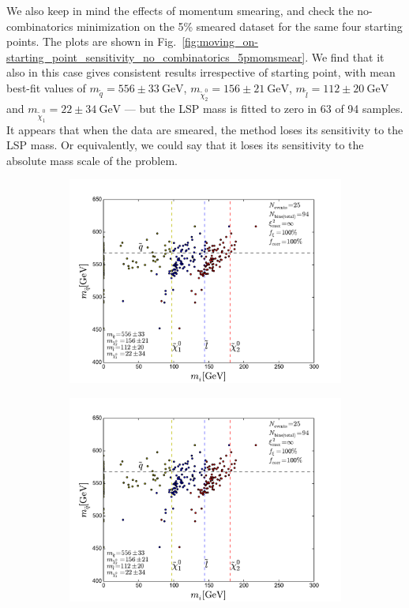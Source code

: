 \documentclass[twoside,english]{uiofysmaster}
\begin{document}
We also keep in mind the effects of momentum smearing, and check the no-combinatorics minimization on the 5\% smeared dataset for the same four starting points. The plots are shown in Fig.\ \ref{fig:moving_on-starting_point_sensitivity_no_combinatorics_5pmomsmear}. We find that it also in this case gives consistent results irrespective of starting point, with mean best-fit values of $m_{\tilde q} = 556\pm 33~\mathrm{GeV}$, $m_{\tilde\chi_2^0} = 156 \pm 21~\mathrm{GeV}$, $m_{\tilde l} = 112 \pm 20~\mathrm{GeV}$ and $m_{\tilde\chi_1^0} = 22 \pm 34~\mathrm{GeV}$ --- but the LSP mass is fitted to zero in 63 of 94 samples. It appears that when the data are smeared, the method loses its sensitivity to the LSP mass. Or equivalently, we could say that it loses its sensitivity to the absolute mass scale of the problem. 
\begin{figure}[hbtp!]
	\centering
	\begin{subfigure}[b]{0.45\textwidth}
		\includegraphics[width=\textwidth]{figures/improving_combinatorics/herwigpp_5psmear_lowtol_nocomb_TMP.pdf} 
		\caption{ }
	\end{subfigure}
	\begin{subfigure}[b]{0.45\textwidth}
		\includegraphics[width=\textwidth]{figures/improving_combinatorics/herwigpp_5psmear_lowtol_nocomb_400-300-200-100.pdf}
		\caption{ } 
	\end{subfigure}


\end{figure}
\end{document}
